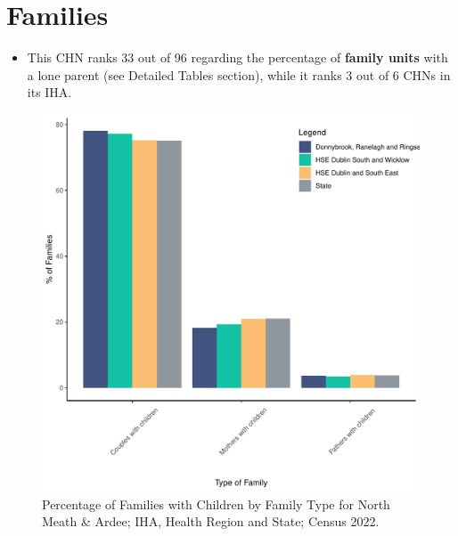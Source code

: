 \documentclass{article}
\begin{document}
\section{Families}\label{sect:Fam}
\begin{itemize}
\item This CHN ranks  33 out of 96 regarding the percentage of \textbf{family units} with a lone parent (see Detailed Tables section), while it ranks   3 out of 6 CHNs in its IHA.
\end{itemize}
\begin{figure}[H]
	\centering
	\includegraphics[width = 150mm]{../figures/FamED.pdf}
	\caption{Percentage of Families with Children by Family Type for North Meath & Ardee; IHA, Health Region and State; Census 2022.}
	\label{fig:vbnv}
	\end{figure}
	
\end{document}
